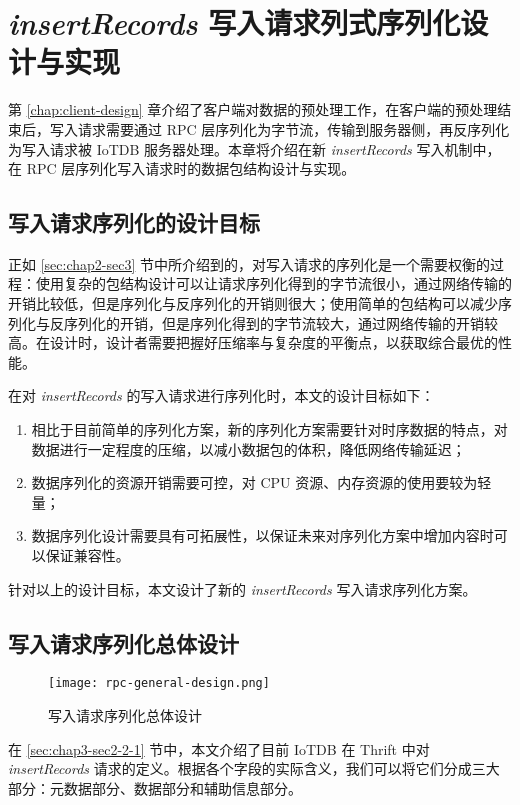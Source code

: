 
\chapter{\emph{insertRecords} 写入请求列式序列化设计与实现\label{sec:chap6}}
第 \ref{chap:client-design} 章介绍了客户端对数据的预处理工作，在客户端的预处理结束后，写入请求需要通过 RPC 层序列化为字节流，传输到服务器侧，再反序列化为写入请求被 IoTDB 服务器处理。本章将介绍在新 \emph{insertRecords} 写入机制中，在 RPC 层序列化写入请求时的数据包结构设计与实现。

\section{写入请求序列化的设计目标}
正如 \ref{sec:chap2-sec3} 节中所介绍到的，对写入请求的序列化是一个需要权衡的过程：使用复杂的包结构设计可以让请求序列化得到的字节流很小，通过网络传输的开销比较低，但是序列化与反序列化的开销则很大；使用简单的包结构可以减少序列化与反序列化的开销，但是序列化得到的字节流较大，通过网络传输的开销较高。在设计时，设计者需要把握好压缩率与复杂度的平衡点，以获取综合最优的性能。

在对 \emph{insertRecords} 的写入请求进行序列化时，本文的设计目标如下：
\begin{enumerate}
  \item 相比于目前简单的序列化方案，新的序列化方案需要针对时序数据的特点，对数据进行一定程度的压缩，以减小数据包的体积，降低网络传输延迟；
  \item 数据序列化的资源开销需要可控，对 CPU 资源、内存资源的使用要较为轻量；
  \item 数据序列化设计需要具有可拓展性，以保证未来对序列化方案中增加内容时可以保证兼容性。
\end{enumerate}
针对以上的设计目标，本文设计了新的 \emph{insertRecords} 写入请求序列化方案。

\section{写入请求序列化总体设计}
\begin{figure}
  \centering
  \texttt{[image: rpc-general-design.png]}
  \caption{写入请求序列化总体设计}
  \label{fig:rpc-general-design}
\end{figure}

在 \ref{sec:chap3-sec2-2-1} 节中，本文介绍了目前 IoTDB 在 Thrift 中对 \emph{insertRecords} 请求的定义。根据各个字段的实际含义，我们可以将它们分成三大部分：元数据部分、数据部分和辅助信息部分。

